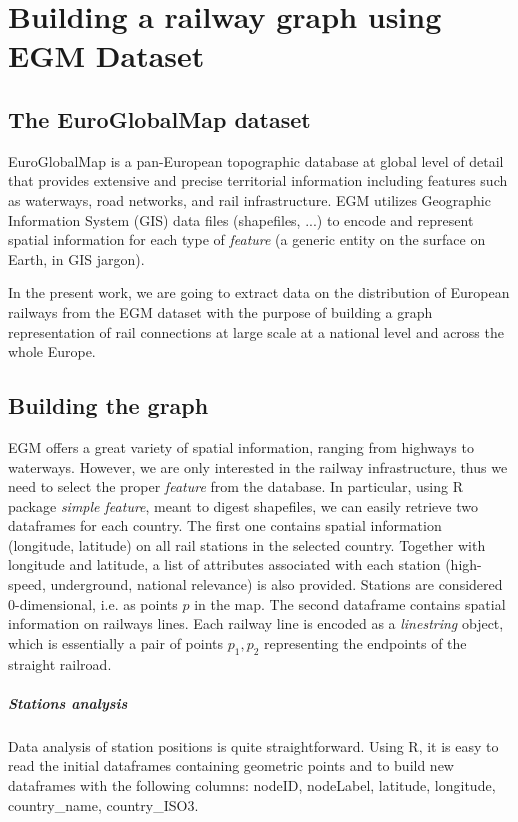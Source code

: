 \chapter{Building a railway graph using EGM Dataset}




\section{The EuroGlobalMap dataset}
 
EuroGlobalMap \cite{EGM} is a pan-European topographic database at global level of detail that provides extensive and precise territorial information including features such as waterways, road networks, and rail infrastructure. EGM utilizes Geographic Information System (GIS) data files (shapefiles, ...) to encode and represent spatial information for each type of \textit{feature} (a generic entity on the surface on Earth, in GIS jargon).

In the present work, we are going to extract data on the distribution of European railways from the EGM dataset with the purpose of building a graph representation of rail connections at large scale at a national level and across the whole Europe.
\section{Building the graph}

EGM offers a great variety of spatial information, ranging from highways to waterways. However, we are only interested in the railway infrastructure, thus we need to select the proper \textit{feature} from the database. In particular, using R package \textit{simple feature}, meant to digest shapefiles, we can easily retrieve two dataframes for each country. The first one contains spatial information (longitude, latitude) on all rail stations in the selected country. Together with longitude and latitude, a list of attributes associated with each station (high-speed, underground, national relevance) is also provided. Stations are considered $0$-dimensional, i.e. as points $p$ in the map. The second dataframe contains spatial information on railways lines. Each railway line is encoded as a \textit{linestring} object, which is essentially a pair of points $p_1, p_2$ representing the endpoints of the straight railroad. 

\paragraph{Stations analysis} Data analysis of station positions is quite straightforward. Using R, it is easy to read the initial dataframes containing geometric points and to build new dataframes with the following columns:
nodeID, nodeLabel, latitude, longitude, country\_name, country\_ISO3.

